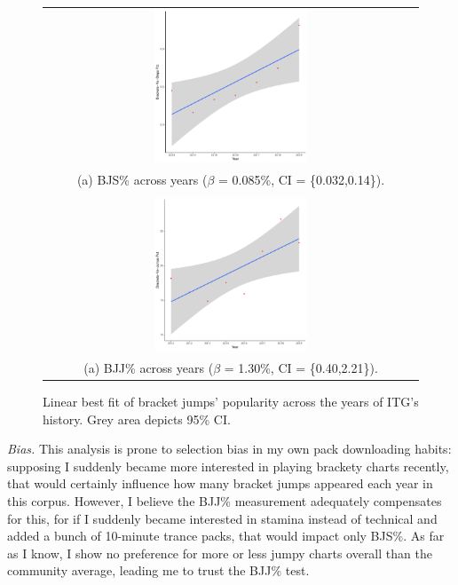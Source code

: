 \documentclass[10pt]{sigplanconf}
\begin{document}
\begin{figure}[t]
	\begin{tabular}{c}
		\includegraphics[width=0.42\textwidth]{step_plot.pdf}
		\\
		(a) BJS\% across years ($\beta$ = 0.085\%, CI = \{0.032,0.14\}).
		\\
		\\
		\includegraphics[width=0.42\textwidth]{jump_plot.pdf}
		\\
		(a) BJJ\% across years ($\beta$ = 1.30\%, CI = \{0.40,2.21\}).
	\end{tabular}
	\caption{Linear best fit of bracket jumps' popularity across the years of ITG's history.
	Grey area depicts 95\% CI.}
	\label{fig:stats}
\end{figure}

\textit{Bias.}
This analysis is prone to selection bias in my own pack downloading habits:
supposing I suddenly became more interested in playing brackety charts recently,
that would certainly influence how many bracket jumps appeared each year in this corpus.
However, I believe the BJJ\% measurement adequately compensates for this,
for if I suddenly became interested in stamina instead of technical and added a bunch of 10-minute trance packs,
that would impact only BJS\%.
As far as I know, I show no preference for more or less jumpy charts overall than the community average,
leading me to trust the BJJ\% test.
\end{document}
